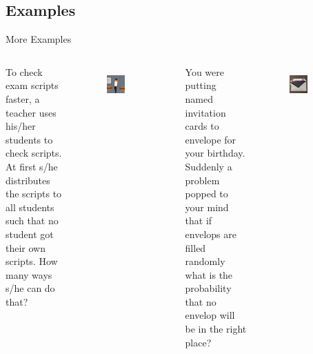 \documentclass[9pt]{beamer}
\begin{document}
\subsection{Examples}

\begin{frame}{More Examples}
    \vspace{1cm}
    \begin{columns}

        To check exam scripts faster, a teacher uses his/her students to check scripts. At first s/he distributes the scripts to all students such that no student got their own scripts. How many ways s/he can do that?
        \vspace{0.5cm}
        \begin{figure}
            \centering
            \includegraphics[width=0.5\textwidth]{exam_02.jpeg}
            \label{fig:exam_scripts}
        \end{figure}

        \pause

        You were putting named invitation cards to envelope for your birthday. Suddenly a problem popped to your mind that if envelops are filled randomly what is the probability that no envelop will be in the right place?
        \vspace{0.5cm}
        \begin{figure}[b]
            \centering
            \includegraphics[width=0.5\textwidth]{envelope.jpeg}
            \label{fig:envelope}
        \end{figure}
    \end{columns}
    
\end{frame}
\end{document}
